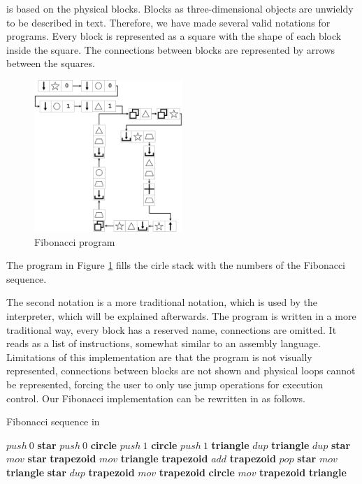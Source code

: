 \sculpt is based on the physical blocks. Blocks as three-dimensional objects are unwieldy to be described in text.
Therefore, we have made several valid notations for \sculpt programs.
Every block is represented as a square with the shape of each block inside the square. 
The connections between blocks are represented by arrows between the squares.

\begin{figure}
    \centering
    \includegraphics[width=0.5\textwidth]{figures/ArtlangFibpng}
    \caption{\sculpt Fibonacci program}
    \label{fig:artlangfib}
    \vspace{5pt}
\end{figure}

The program in Figure \ref{fig:artlangfib} fills the cirle stack with the numbers of the Fibonacci sequence.

The second notation is a more traditional notation, which is used by the \sculpter interpreter, which will be explained afterwards.
The program is written in a more traditional way, every block has a reserved name, connections are omitted. It reads as a list of instructions, somewhat similar to an assembly language.
Limitations of this implementation are that the program is not visually represented, connections between blocks are not shown and physical loops cannot be represented, forcing the user to only use jump operations for execution control.
Our Fibonacci implementation can be rewritten in \sculpter as follows.

\begin{algorithm}
    \caption{Fibonacci sequence in \sculpt}
    \begin{algorithmic}
    \State $push~0$ \textbf{star}
    \State $push~0$ \textbf{circle}
    \State $push~1$ \textbf{circle}
    \State $push~1$ \textbf{triangle}
        \State $dup$ \textbf{triangle}
        \State $dup$ \textbf{star}
        \State $mov$ \textbf{star} \textbf{trapezoid}
        \State $mov$ \textbf{triangle} \textbf{trapezoid}
        \State $add$ \textbf{trapezoid}
        \State $pop$ \textbf{star}
        \State $mov$ \textbf{triangle} \textbf{star}
        \State $dup$ \textbf{trapezoid}
        \State $mov$ \textbf{trapezoid} \textbf{circle}
        \State $mov$ \textbf{trapezoid} \textbf{triangle}
    \EndWhile
    \end{algorithmic}
    \end{algorithm}
\endinput

